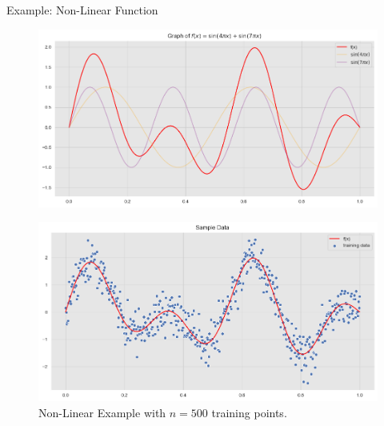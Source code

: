 \documentclass[10pt]{beamer}
\begin{document}
\begin{frame}{Example: Non-Linear Function}{\cite{gaussian_process_reg_2019}}
\begin{center}
\begin{figure}
\includegraphics[scale=0.25]{images/gaussian_process_regression_files/gaussian_process_regression_6_0.png} 
\end{figure}
\end{center}
\begin{center}
\begin{figure}
\includegraphics[scale=0.25]{images/gaussian_process_regression_files/gaussian_process_regression_12_0.png} 
\caption{Non-Linear Example with $n=500$ training points.}
\end{figure}
\end{center}
\end{frame}
\end{document}
